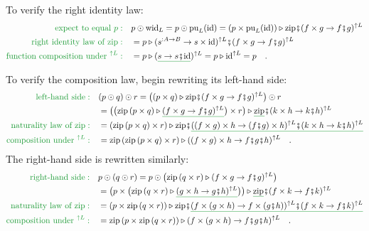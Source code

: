 To verify the right identity law:
\begin{align*}
{\color{greenunder}\text{expect to equal }p:}\quad & p\odot\text{wid}_{L}=p\odot\text{pu}_{L}(\text{id})=(p\times\text{pu}_{L}(\text{id}))\triangleright\text{zip}\bef(f\times g\rightarrow f\bef g)^{\uparrow L}\\
{\color{greenunder}\text{right identity law of }\text{zip}:}\quad & =p\triangleright(s^{:A\rightarrow B}\rightarrow s\times\text{id})^{\uparrow L}\bef(f\times g\rightarrow f\bef g)^{\uparrow L}\\
{\color{greenunder}\text{function composition under }^{\uparrow L}:}\quad & =p\triangleright(\gunderline{s\rightarrow s\bef\text{id}})^{\uparrow L}=p\triangleright\text{id}^{\uparrow L}=p\quad.
\end{align*}

To verify the composition law, begin rewriting its left-hand side:
\begin{align*}
{\color{greenunder}\text{left-hand side}:}\quad & (p\odot q)\odot r=\big((p\times q)\triangleright\text{zip}\bef(f\times g\rightarrow f\bef g)^{\uparrow L}\big)\odot r\\
 & =\big(\big(\text{zip}\left(p\times q\right)\triangleright\gunderline{(f\times g\rightarrow f\bef g)^{\uparrow L}}\big)\times r\big)\triangleright\gunderline{\text{zip}}\bef(k\times h\rightarrow k\bef h)^{\uparrow L}\\
{\color{greenunder}\text{naturality law of }\text{zip}:}\quad & =(\text{zip}\left(p\times q\right)\times r)\triangleright\text{zip}\bef\gunderline{((f\times g)\times h\rightarrow(f\bef g)\times h)^{\uparrow L}\bef(k\times h\rightarrow k\bef h)^{\uparrow L}}\\
{\color{greenunder}\text{composition under }^{\uparrow L}:}\quad & =\text{zip}\left(\text{zip}\left(p\times q\right)\times r\right)\triangleright((f\times g)\times h\rightarrow f\bef g\bef h)^{\uparrow L}\quad.
\end{align*}
The right-hand side is rewritten similarly:
\begin{align*}
{\color{greenunder}\text{right-hand side}:}\quad & p\odot(q\odot r)=p\odot\big(\text{zip}\left(q\times r\right)\triangleright(f\times g\rightarrow f\bef g)^{\uparrow L}\big)\\
 & =\big(p\times\big(\text{zip}\left(q\times r\right)\triangleright\gunderline{(g\times h\rightarrow g\bef h)^{\uparrow L}}\big)\big)\triangleright\gunderline{\text{zip}}\bef(f\times k\rightarrow f\bef k)^{\uparrow L}\\
{\color{greenunder}\text{naturality law of }\text{zip}:}\quad & =(p\times\text{zip}\left(q\times r\right))\triangleright\text{zip}\bef\gunderline{(f\times(g\times h)\rightarrow f\times(g\bef h))^{\uparrow L}\bef(f\times k\rightarrow f\bef k)^{\uparrow L}}\\
{\color{greenunder}\text{composition under }^{\uparrow L}:}\quad & =\text{zip}\left(p\times\text{zip}\left(q\times r\right)\right)\triangleright(f\times(g\times h)\rightarrow f\bef g\bef h)^{\uparrow L}\quad.
\end{align*}
